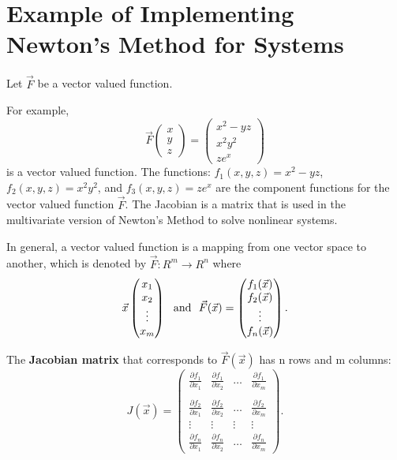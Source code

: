 \documentclass[twoside]{article}
\def\ds{\displaystyle}
\begin{document}
\section{Example of Implementing Newton's Method for Systems}

Let $\ds \vec F$ be a vector valued function.

For example,
\begin{equation} 
\vec F \begin{pmatrix} x \\ y \\ z  \end{pmatrix} = \begin{pmatrix} x^2 - yz \\ x^2y^2 \\ ze^x \end{pmatrix} 
\label{e:ex1}
\end{equation}
is a vector valued function. The functions: $\ds f_1(x,y,z)=x^2-yz$, $\ds f_2(x,y,z) = x^2y^2$, and $\ds f_3(x,y,z)=ze^x$ are the component functions for the vector valued function $\ds \vec F$. The Jacobian is a matrix that is used in the multivariate version of Newton's Method to solve nonlinear systems.

In general, a vector valued function is a mapping from one vector space to another, which is denoted by $\ds \vec F : R^m \rightarrow R^n$ where
$$\vec x \begin{pmatrix} x_1 \cr x_2 \cr \vdots \cr x_m  \end{pmatrix} \ \ {\rm and} \ \ \vec F(\vec x) = \begin{pmatrix} f_1(\vec x) \cr f_2(\vec x) \cr \vdots \cr f_n(\vec x) \end{pmatrix}.$$

The {\bf Jacobian matrix} that corresponds to $\ds \vec F(\vec x)$ has n rows and m columns:
\begin{equation}
J(\vec x) = \begin{pmatrix} \frac {\partial f_1}{\partial x_1} & \frac {\partial f_1}{\partial x_2} & \dots & \frac {\partial f_1}{\partial x_m}   \\  \\  \frac {\partial f_2}{\partial x_1} & \frac {\partial f_2}{\partial x_2} & \dots & \frac {\partial f_2}{\partial x_m} \\ \vdots & \vdots & \vdots & \vdots \\ \frac {\partial f_n}{\partial x_1} & \frac {\partial f_n}{\partial x_2} & \dots & \frac {\partial f_n}{\partial x_m}  \end{pmatrix}. \label{e:def}
\end{equation}
\end{document}
